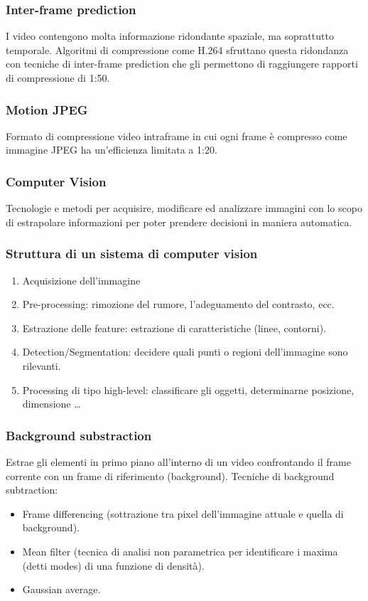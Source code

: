 \documentclass[8pt,a4paper]{article}
\begin{document}
\begin{multicols}{5}
    \subsubsection{Inter-frame prediction}
    I video contengono molta informazione ridondante spaziale, ma soprattutto temporale. 
    Algoritmi di compressione come H.264 sfruttano questa ridondanza con tecniche 
    di inter-frame prediction che gli permettono di raggiungere rapporti di compressione 
    di 1:50.

    \subsubsection{Motion JPEG}
    Formato di compressione video intraframe in cui ogni frame è compresso come 
    immagine JPEG ha un’efficienza limitata a 1:20. 

    \subsubsection{Computer Vision}
    Tecnologie e metodi per acquisire, modificare ed analizzare immagini con lo 
    scopo di estrapolare informazioni per poter prendere decisioni in maniera automatica.

    \subsubsection{Struttura di un sistema di computer vision}
    \begin{enumerate}
      \item Acquisizione dell’immagine
      \item Pre-processing: rimozione del rumore, l’adeguamento del contrasto, ecc.
      \item Estrazione delle feature: estrazione di caratteristiche (linee, contorni).
      \item Detection/Segmentation: decidere quali punti o regioni dell’immagine sono 
      rilevanti.
      \item Processing di tipo high-level: classificare gli oggetti, determinarne 
      posizione, dimensione …
    \end{enumerate}
    
    \subsubsection{Background substraction}
    Estrae gli elementi in primo piano all’interno di un video confrontando il frame 
    corrente con un frame di riferimento (background). Tecniche di background subtraction: 
    \begin{itemize}
      \item Frame differencing (sottrazione tra pixel dell’immagine attuale e quella di 
      background).
      \item Mean filter (tecnica di analisi non parametrica per identificare i maxima 
      (detti modes) di una funzione di densità).
      \item Gaussian average.
    \end{itemize}


\end{multicols}
\end{document}

